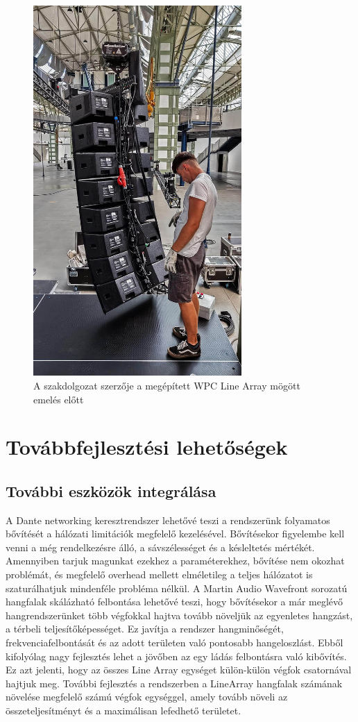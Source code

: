 \begin {figure}[H]
    \centering
    \includegraphics[width=300px]{figures/danci_wpc.jpg}
    \caption{A szakdolgozat szerzője a megépített WPC Line Array mögött emelés előtt}
\end {figure}
\section{Továbbfejlesztési lehetőségek}
\subsection{További eszközök integrálása}
A Dante networking keresztrendszer lehetővé teszi a rendszerünk folyamatos bővítését a
hálózati limitációk megfelelő kezelésével. Bővítésekor figyelembe kell venni a
még rendelkezésre álló, a sávszélességet és a késleltetés mértékét. Amennyiben
tarjuk magunkat ezekhez a paraméterekhez, bővítése nem okozhat problémát,
és megfelelő overhead mellett elméletileg a teljes hálózatot is szaturálhatjuk mindenféle probléma nélkül.
A Martin Audio Wavefront sorozatú hangfalak skálázható felbontása lehetővé teszi, hogy
bővítésekor a már meglévő hangrendszerünket több végfokkal hajtva tovább
növeljük az egyenletes hangzást, a térbeli teljesítőképességet. Ez
javítja a rendszer hangminőségét, frekvenciafelbontását és az adott területen való
pontosabb hangeloszlást. Ebből kifolyólag nagy fejlesztés lehet a jövőben az egy ládás
felbontásra való kibővítés. Ez azt jelenti, hogy az összes Line Array egységet külön-külön
végfok csatornával hajtjuk meg.
További fejlesztés a rendszerben a LineArray hangfalak számának növelése megfelelő számú végfok egységgel,
amely tovább növeli az összeteljesítményt és a maximálisan lefedhető területet.
